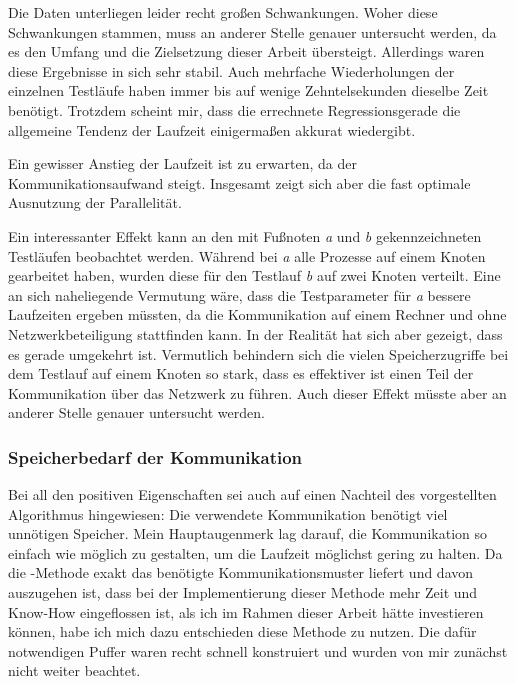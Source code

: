   Die Daten unterliegen leider recht großen Schwankungen. Woher diese Schwankungen stammen, muss an anderer Stelle genauer untersucht werden, da es den Umfang und die Zielsetzung dieser Arbeit 
  übersteigt. Allerdings waren diese Ergebnisse in sich sehr stabil. Auch mehrfache Wiederholungen der einzelnen Testläufe haben immer bis auf wenige Zehntelsekunden dieselbe Zeit benötigt. 
  Trotzdem scheint mir, dass die errechnete Regressionsgerade die allgemeine Tendenz der Laufzeit einigermaßen akkurat wiedergibt.
  
  Ein gewisser Anstieg der Laufzeit ist zu erwarten, da der Kommunikationsaufwand steigt. Insgesamt zeigt sich aber die fast optimale Ausnutzung der Parallelität.
  
  Ein interessanter Effekt kann an den mit Fußnoten \textit{a} und \textit{b} gekennzeichneten Testläufen beobachtet werden. Während bei \textit{a} alle Prozesse auf einem Knoten gearbeitet haben, 
  wurden diese für den Testlauf \textit{b} auf zwei Knoten verteilt. Eine an sich naheliegende Vermutung wäre, dass die Testparameter für \textit{a} bessere Laufzeiten ergeben müssten,
  da die Kommunikation auf einem Rechner und ohne Netzwerkbeteiligung stattfinden kann. In der Realität hat sich aber gezeigt, dass es gerade umgekehrt ist. Vermutlich behindern sich die vielen 
  Speicherzugriffe bei dem Testlauf auf einem Knoten so stark, dass es effektiver ist einen Teil der Kommunikation über das Netzwerk zu führen. Auch dieser Effekt müsste aber an anderer Stelle 
  genauer untersucht werden.
  
  \clearpage
  
  \subsubsection{Speicherbedarf der Kommunikation}
  Bei all den positiven Eigenschaften sei auch auf einen Nachteil des vorgestellten Algorithmus hingewiesen: Die verwendete Kommunikation benötigt viel unnötigen Speicher. Mein Hauptaugenmerk lag
  darauf, die Kommunikation so einfach wie möglich zu gestalten, um die Laufzeit möglichst gering zu halten. Da die -Methode exakt das benötigte Kommunikationsmuster liefert
  und davon auszugehen ist, dass bei der Implementierung dieser Methode mehr Zeit und Know-How eingeflossen ist, als ich im Rahmen dieser Arbeit hätte investieren können, habe ich mich dazu entschieden
  diese Methode zu nutzen. Die dafür notwendigen Puffer waren recht schnell konstruiert und wurden von mir zunächst nicht weiter beachtet. 
  
